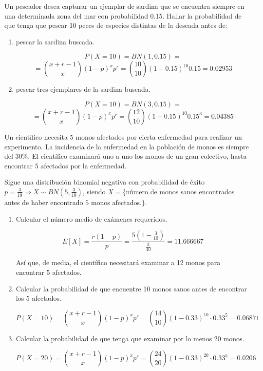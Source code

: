\begin{ejer}
Un pescador desea capturar un ejemplar de sardina que se encuentra siempre en una determinada zona del mar con probabilidad 0.15. Hallar la probabilidad de que tenga que pescar 10 peces de especies distintas de la deseada antes de:
\end{ejer}
\begin{sol}
\begin{enumerate}

Sigue una distribución binomial negativa con probabilidad de éxito $p=0.15 \Longrightarrow X \sim BN(r,0.15)$, siendo $X=\{$número de peces de diferente especie pescados antes de haber pescado $k$ sardinas.$\}$


\item pescar la sardina buscada.

\[
P(X=10)=BN(1,0.15)=
\]
\[
=\binom{x+r-1}{x}(1-p)^xp^r=\binom{10}{10}(1-0.15)^{10}0.15=0.02953
\]
\item pescar tres ejemplares de la sardina buscada.

\[
P(X=10)=BN(3,0.15)=
\]
\[
=\binom{x+r-1}{x}(1-p)^xp^r=\binom{12}{10}(1-0.15)^{10}0.15^3=0.04385
\]

\end{enumerate}
\end{sol}

\begin{ejer}
Un científico necesita 5 monos afectados por cierta enfermedad para realizar un experimento. La incidencia de la enfermedad en la población de monos es siempre del 30\%. El científico examinará uno a uno los monos de un gran colectivo, hasta encontrar 5 afectados por la enfermedad.

\end{ejer}
\begin{sol}

Sigue una distribución binomial negativa con probabilidad de éxito $p=\frac{3}{10} \Longrightarrow X \sim BN(5,\frac{3}{10})$, siendo $X=\{$número de monos sanos encontrados antes de haber encontrado $5$ monos afectados.$\}$.


\begin{enumerate}
\item Calcular el número medio de exámenes requeridos.

\[
E[X]=\frac{r(1-p)}{p}=\frac{5(1-\frac{3}{10})}{\frac{3}{10}}=11.666667
\]

Así que, de media, el científico necesitará examinar a 12 monos para encontrar 5 afectados.

\item Calcular la probabilidad de que encuentre 10 monos sanos antes de encontrar los 5 afectados.

\[
P(X=10)=\binom{x+r-1}{x}(1-p)^xp^r=\binom{14}{10}(1-0.33)^{10}\cdot 0.33^5=0.06871
\]

\item Calcular la probabilidad de que tenga que examinar por lo menos 20 monos.

\[
P(X=20)=\binom{x+r-1}{x}(1-p)^xp^r=\binom{24}{20}(1-0.33)^{20}\cdot 0.33^5=0.0206
\]


\end{enumerate}
\end{sol}

